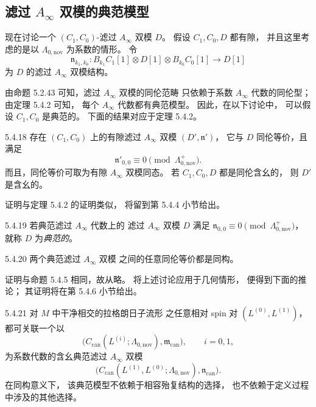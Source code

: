 
\subsection{滤过 $A_\infty$ 双模的典范模型}
\label{subsec:5-4-2}

现在讨论一个 $(C_1,C_0)$-滤过
$A_\infty$ 双模 $D$。
假设 $C_1,C_0,D$ 都有隙，
并且这里考虑的是以
$\Lambda_{0,\mathrm{nov}}$ 为系数的情形。
令
\[
\mathfrak n_{k_1,k_0}\colon
B_{k_1}C_1[1]\otimes D[1]\otimes
B_{k_0}C_0[1]\longrightarrow D[1]
\]
为 $D$ 的滤过 $A_\infty$ 双模结构。

由命题 5.2.43 可知，滤过
$A_\infty$ 双模的同伦范畴
只依赖于系数 $A_\infty$ 代数的同伦型；
由定理 5.4.2 可知，
每个 $A_\infty$ 代数都有典范模型。
因此，在以下讨论中，
可以假设 $C_1,C_0$ 是典范的。
下面的结果对应于定理 5.4.2。

\begin{theorem}{5.4.18}\label{thm:5-4-18}
存在 $(C_1,C_0)$ 上的有隙滤过
$A_\infty$ 双模 $(D',\mathfrak n')$，
它与 $D$ 同伦等价，且满足
\[
\mathfrak n'_{0,0}\equiv0
\pmod{\Lambda^+_{0,\mathrm{nov}}}.
\]
而且，同伦等价可取为有隙
$A_\infty$ 双模同态。
若 $C_1,C_0,D$ 都是同伦含幺的，
则 $D'$ 是含幺的。
\end{theorem}

证明与定理 5.4.2 的证明类似，
将留到第 5.4.4 小节给出。

\begin{definition}{5.4.19}\label{def:5-4-19}
若典范滤过 $A_\infty$ 代数上的
滤过 $A_\infty$ 双模 $D$
满足
$\mathfrak n_{0,0}\equiv0
\pmod{\Lambda^+_{0,\mathrm{nov}}}$，
就称 $D$ 为\emph{典范的}。
\end{definition}

\begin{proposition}{5.4.20}\label{prop:5-4-20}
两个典范滤过 $A_\infty$ 双模
之间的任意同伦等价都是同构。
\end{proposition}

证明与命题 5.4.5 相同，故从略。
将上述讨论应用于几何情形，
便得到下面的推论；
其证明将在第 5.4.6 小节给出。

\begin{corollary}{5.4.21}\label{cor:5-4-21}
对 $M$ 中干净相交的拉格朗日子流形
之任意相对 spin 对
$(L^{(0)},L^{(1)})$，
都可关联一个以
\[
\bigl(
C_{\mathrm{can}}(L^{(i)};\Lambda_{0,\mathrm{nov}}),
\mathfrak m_{\mathrm{can}}
\bigr),\qquad i=0,1,
\]
为系数代数的含幺典范滤过
$A_\infty$ 双模
\[
\bigl(
C_{\mathrm{can}}(L^{(1)},L^{(0)};
\Lambda_{0,\mathrm{nov}}),
\mathfrak n_{\mathrm{can}}
\bigr).
\]
在同构意义下，
该典范模型不依赖于相容殆复结构的选择，
也不依赖于定义过程中涉及的其他选择。
\end{corollary}

